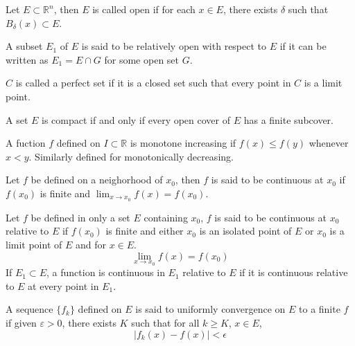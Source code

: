 \documentclass[openany]{book}
\newcommand{\R}{\mathbb{R}}
\begin{document}
\begin{defn}
    Let $E\subset\R^n$, then $E$ is called open if for each $x\in E$, there exists $\delta$ such that $B_\delta(x)\subset E$.

    A subset $E_1$ of $E$ is said to be relatively open with respect to $E$ if it can be written as $E_1=E\cap G$ for some open set $G$. 
\end{defn}
\begin{defn}
    $C$ is called a perfect set if it is a closed set such that every point in $C$ is a limit point.
\end{defn}
\begin{defn}
    A set $E$ is compact if and only if every open cover of $E$ has a finite subcover. 
\end{defn}
\begin{defn}
    A fuction $f$ defined on $I\subset\R$ is monotone increasing if $f(x)\leq f(y)$ whenever $x<y$. Similarly defined for monotonically decreasing.
\end{defn}
\begin{defn}[continuous]
    Let $f$ be defined on a neighorhood of $x_0$, then $f$ is said to be continuous at $x_0$ if $f(x_0)$ is finite and $\lim_{x\to x_0}f(x)=f(x_0)$.
\end{defn}
\begin{defn}
    Let $f$ be defined in only a set $E$ containing $x_0$, $f$ is said to be continuous at $x_0$ relative to $E$ if $f(x_0)$ is finite and either $x_0$ is an isolated point of $E$ or $x_0$ is a limit point of $E$ and for $x\in E$.
    \begin{equation*}
        \lim_{x\to x_0}f(x)=f(x_0)
    \end{equation*}
    If $E_1\subset E$, a function is continuous in $E_1$ relative to $E$ if it is continuous relative to $E$ at every point in $E_1$.
\end{defn}
\begin{defn}
    A sequence $\{f_k\}$ defined on $E$ is said to uniformly convergence on $E$ to a finite $f$ if given $\varepsilon>0$, there exists $K$ such that for all $k\geq K$, $x\in E$,
    \begin{equation*}
        |f_k(x)-f(x)|<\epsilon
    \end{equation*}
\end{defn}
\end{document}
